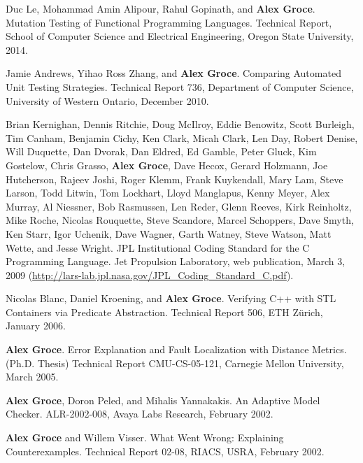 \documentclass[ComputerScience]{vita}
\begin{document}
\begin{vita}
\begin{Technical Reports}
\item
Duc Le, Mohammad Amin Alipour, Rahul Gopinath, and {\bf Alex Groce}.
\newblock Mutation Testing of Functional Programming Languages.
\newblock Technical Report, School of Computer Science and Electrical Engineering, Oregon State University, 2014.

\item
Jamie Andrews, Yihao Ross Zhang, and {\bf Alex Groce}.
\newblock Comparing Automated Unit Testing Strategies.
\newblock Technical Report 736, Department of Computer Science, University of Western Ontario, December 2010.

\item
Brian Kernighan, Dennis Ritchie, Doug McIlroy, Eddie Benowitz, Scott Burleigh, Tim Canham, Benjamin Cichy, Ken Clark, Micah Clark, Len Day, Robert Denise, Will Duquette, Dan Dvorak, Dan Eldred, Ed Gamble, Peter Gluck, Kim Gostelow, Chris Grasso, {\bf Alex Groce}, Dave Hecox, Gerard Holzmann, Joe Hutcherson, Rajeev Joshi, Roger Klemm, Frank Kuykendall, Mary Lam, Steve Larson, Todd Litwin, Tom Lockhart, Lloyd Manglapus, Kenny Meyer, Alex Murray, Al Niessner, Bob Rasmussen, Len Reder, Glenn Reeves, Kirk Reinholtz, Mike Roche, Nicolas Rouquette, Steve Scandore, Marcel Schoppers, Dave Smyth, Ken Starr, Igor Uchenik, Dave Wagner, Garth Watney, Steve Watson, Matt Wette, and Jesse Wright.
\newblock JPL Institutional Coding Standard for the C Programming Language.
\newblock Jet Propulsion Laboratory, web publication, March 3, 2009 (\url{http://lars-lab.jpl.nasa.gov/JPL\_Coding\_Standard\_C.pdf}).

\item
Nicolas Blanc, Daniel Kroening, and {\bf Alex Groce}.
\newblock Verifying C++ with STL Containers via Predicate Abstraction.
\newblock Technical Report 506, ETH Z\"urich, January 2006.

\item
{\bf Alex Groce}.
\newblock Error Explanation and Fault Localization with Distance Metrics.
\newblock (Ph.D. Thesis) Technical Report CMU-CS-05-121, Carnegie Mellon University, March 2005.

\item
{\bf Alex Groce}, Doron Peled, and Mihalis Yannakakis.
 An Adaptive Model Checker.
\newblock ALR-2002-008, Avaya Labs Research, February 2002.

\item
{\bf Alex Groce} and Willem Visser.
\newblock What Went Wrong: Explaining Counterexamples.
\newblock Technical Report 02-08, RIACS, USRA, February 2002.


\end{Technical Reports}
\end{vita}
\end{document}
